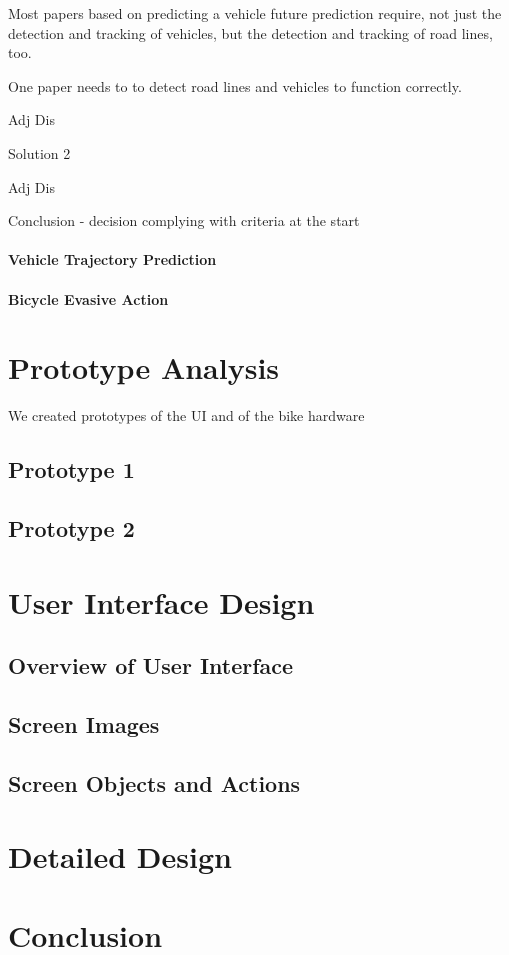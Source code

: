 \documentclass[]{report}
\begin{document}
Most papers based on predicting a vehicle future prediction require, not just the detection and tracking of vehicles, but the detection and tracking of road lines, too. 

One paper \citep{multi-cue} needs to to detect road lines and vehicles to function correctly. 

Adj 
Dis

Solution 2

Adj 
Dis

Conclusion - decision complying with criteria at the start

\subsubsection{Vehicle Trajectory Prediction}

\subsubsection{Bicycle Evasive Action}

\chapter{Prototype Analysis}
We created prototypes of the UI and of the bike hardware 
\section{Prototype 1}

\section{Prototype 2}

\chapter{User Interface Design}
\section{Overview of User Interface}  
\section{Screen Images}
\section{Screen Objects and Actions}

\chapter{Detailed Design}

\chapter{Conclusion}



\end{document}
